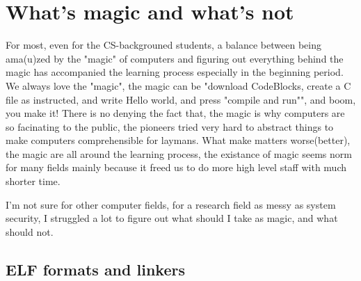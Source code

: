 \section{What's magic and what's not}
\label{sec:magic}
For most, even for the CS-backgrouned students, a balance between being ama(u)zed by the "magic" of computers and figuring out everything behind the magic 
has accompanied the learning process especially in the beginning period.
We always love the "magic", the magic can be "download CodeBlocks, create a C file as instructed, and write Hello world, and press "compile and run"", and boom, you make it!
There is no denying the fact that, the magic is why computers are so facinating to the public, the pioneers tried very hard to abstract things to make computers comprehensible
for laymans. What make matters worse(better), the magic are all around the learning process, the existance of magic seems norm for many fields mainly because it freed us to do
more high level staff with much shorter time.

I'm not sure for other computer fields, for a research field as messy as system security, I struggled a lot to figure out what should I take as magic, and what should not.

\subsection{ELF formats and linkers}